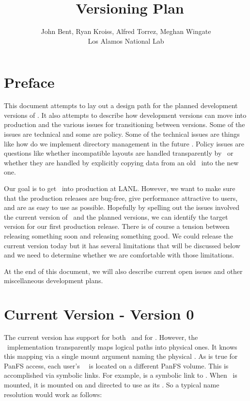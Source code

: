 \documentclass[10pt]{article}
\begin{document}
\title{\plfs\ Versioning Plan}
\author{
    John Bent,
    Ryan Kroiss,
    Alfred Torrez,
    Meghan Wingate
    \\
    Los Alamos National Lab
}
\fi
\date{}
\maketitle
\thispagestyle{empty}
\pagestyle{empty}
\section{Preface}

This document attempts to lay out a design path for the planned development
versions of \plfs.  It also attempts to describe how development versions can
move into production and the various issues for transitioning between versions.
Some of the issues are technical and some are policy.  Some of the technical
issues are things like how do we implement directory management in the future
\mds.  Policy issues are questions like whether incompatible layouts are 
handled transparently by \plfs\ or whether they are handled by explicitly
copying data from an old \plfs\ into the new one.  

Our goal is to get \plfs\ into production at LANL.  However, we want to make 
sure that the production releases are bug-free, give performance attractive
to users, and are as easy to use as possible.  Hopefully by spelling out the
issues involved the current version of \plfs\ and the planned versions, we
can identify the target version for our first production release.  There is
of course a tension between releasing something soon and releasing something
good.  We could release the current version today but it has several 
limitations that will be discussed below and we need to determine whether
we are comfortable with those limitations.

At the end of this document, we will also describe current open issues
and other miscellaneous development plans.

\section{Current Version - Version 0}

The current version has support for both \fuse\ and for \adio.  However,
the \fuse\ implementation transparently maps logical paths into physical
ones.  It knows this mapping via a single mount argument naming the
physical \store.  As is true for PanFS access, each user's \plfs\ \store\ 
is located on a different PanFS volume.  This is accomplished via symbolic
links.  For example, \Path{/plfs/ben} is a symbolic link to 
.  When \plfs\ is mounted, it is mounted 
on \Path{/mnt/plfs} and directed to use \Path{/panfs/scratch} as its \store.
So a typical name resolution would work as follows:
\end{document}
